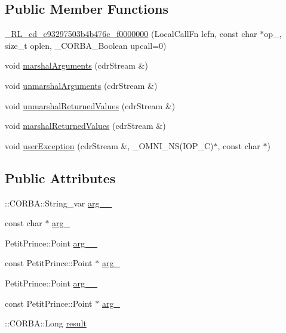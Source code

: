 \subsection*{Public Member Functions}
\begin{DoxyCompactItemize}
\item 
\hyperlink{class__0_r_l__cd__c93297503b4b476c__f0000000_ad3eaa0ebc00da7dc742dbdbf31095bad}{\+\_\+R\+L\+\_\+cd\+\_\+c93297503b4b476c\+\_\+f0000000} (Local\+Call\+Fn lcfn, const char $\ast$op\+\_\+, size\+\_\+t oplen, \+\_\+\+C\+O\+R\+B\+A\+\_\+\+Boolean upcall=0)
\item 
void \hyperlink{class__0_r_l__cd__c93297503b4b476c__f0000000_a81f267829bab9ba9088cc742c8ef5af6}{marshal\+Arguments} (cdr\+Stream \&)
\item 
void \hyperlink{class__0_r_l__cd__c93297503b4b476c__f0000000_aceadb2c1efea07e6ea96340a919763b0}{unmarshal\+Arguments} (cdr\+Stream \&)
\item 
void \hyperlink{class__0_r_l__cd__c93297503b4b476c__f0000000_ad7fbed03bef53a7c91eae50bc47d595d}{unmarshal\+Returned\+Values} (cdr\+Stream \&)
\item 
void \hyperlink{class__0_r_l__cd__c93297503b4b476c__f0000000_add6ae989d8ee5c498af741e94cee1008}{marshal\+Returned\+Values} (cdr\+Stream \&)
\item 
void \hyperlink{class__0_r_l__cd__c93297503b4b476c__f0000000_a1deb1933f6e9069a955129ac562a283f}{user\+Exception} (cdr\+Stream \&, \+\_\+\+O\+M\+N\+I\+\_\+\+NS(I\+O\+P\+\_\+C)$\ast$, const char $\ast$)
\end{DoxyCompactItemize}
\subsection*{Public Attributes}
\begin{DoxyCompactItemize}
\item 
\+::C\+O\+R\+B\+A\+::\+String\+\_\+var \hyperlink{class__0_r_l__cd__c93297503b4b476c__f0000000_a42f779a55d1f4fd887c74846dd62c7ee}{arg\+\_\+\_\+}
\item 
const char $\ast$ \hyperlink{class__0_r_l__cd__c93297503b4b476c__f0000000_acfd83eca6ef903b69b6c90c5b2f5bba3}{arg\+\_}
\item 
Petit\+Prince\+::\+Point \hyperlink{class__0_r_l__cd__c93297503b4b476c__f0000000_aba17f6503cd4d839e8e4da44faa81214}{arg\+\_\+\_\+}
\item 
const Petit\+Prince\+::\+Point $\ast$ \hyperlink{class__0_r_l__cd__c93297503b4b476c__f0000000_a5eaa35de47a96874f0d9a7ad3b791900}{arg\+\_}
\item 
Petit\+Prince\+::\+Point \hyperlink{class__0_r_l__cd__c93297503b4b476c__f0000000_ac6451cd86d3d5189dc4125fec3ba3906}{arg\+\_\+\_\+}
\item 
const Petit\+Prince\+::\+Point $\ast$ \hyperlink{class__0_r_l__cd__c93297503b4b476c__f0000000_aa1250982102c136edb168de08a43b793}{arg\+\_}
\item 
\+::C\+O\+R\+B\+A\+::\+Long \hyperlink{class__0_r_l__cd__c93297503b4b476c__f0000000_a2a668d01c3ab8f7a926dd60b837aa99d}{result}
\end{DoxyCompactItemize}
